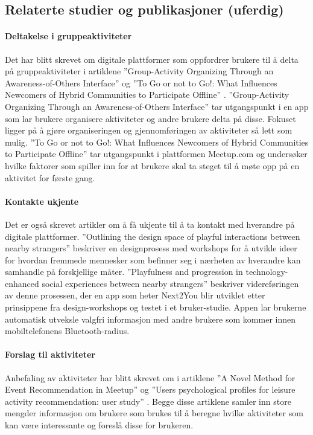 \subsection{Relaterte studier og publikasjoner (uferdig)}

\paragraph{Deltakelse i gruppeaktiviteter}
Det har blitt skrevet om digitale plattformer som oppfordrer brukere til å delta på gruppeaktiviteter i artiklene ''Group-Activity Organizing Through an Awareness-of-Others Interface'' \cite{AWARENESS:3:CSCW18} og ''To Go or not to Go!: What Influences Newcomers of Hybrid Communities to Participate Offline'' \cite{NEWCOMERS:4:CT17}. ''Group-Activity Organizing Through an Awareness-of-Others Interface'' tar utgangspunkt i en app som lar brukere organisere aktiviteter og andre brukere delta på disse. Fokuset ligger på å gjøre organiseringen og gjennomføringen av aktiviteter så lett som mulig. ''To Go or not to Go!: What Influences Newcomers of Hybrid Communities to Participate Offline'' tar utgangspunkt i plattformen Meetup.com og undersøker hvilke faktorer som spiller inn for at brukere skal ta steget til å møte opp på en aktivitet for første gang.

\paragraph{Kontakte ukjente}
Det er også skrevet artikler om å få ukjente til å ta kontakt med hverandre på digitale plattformer. ''Outlining the design space of playful interactions between nearby strangers'' \cite{NEARBY:5:AM16} beskriver en designprosess med workshops for å utvikle ideer for hvordan fremmede mennesker som befinner seg i nærheten av hverandre kan samhandle på forskjellige måter. ''Playfulness and progression in technology-enhanced social experiences between nearby strangers'' \cite{PLAYFUL:6:NORDICHI18} beskriver videreføringen av denne prosessen, der en app som heter Next2You blir utviklet etter prinsippene fra design-workshops og testet i et bruker-studie. Appen lar brukerne automatisk utveksle valgfri informasjon med andre brukere som kommer innen mobiltelefonens Bluetooth-radius.

\paragraph{Forslag til aktiviteter}
Anbefaling av aktiviteter har blitt skrevet om i artiklene ''A Novel Method for Event Recommendation in Meetup'' \cite{MEETUP:7:ASONAM17} og ''Users psychological profiles for leisure activity recommendation: user study'' \cite{PROFILES:10:CITREC17}. Begge disse artiklene samler inn store mengder informasjon om brukere som brukes til å beregne hvilke aktiviteter som kan være interessante og foreslå disse for brukeren.

